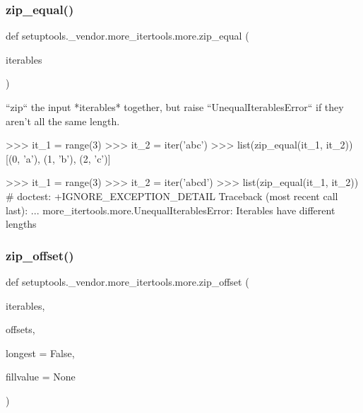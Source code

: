 \subsubsection{\texorpdfstring{zip\+\_\+equal()}{zip\_equal()}}
{\footnotesize\ttfamily def setuptools.\+\_\+vendor.\+more\+\_\+itertools.\+more.\+zip\+\_\+equal (\begin{DoxyParamCaption}\item[{}]{iterables }\end{DoxyParamCaption})}

\begin{DoxyVerb}``zip`` the input *iterables* together, but raise
``UnequalIterablesError`` if they aren't all the same length.

    >>> it_1 = range(3)
    >>> it_2 = iter('abc')
    >>> list(zip_equal(it_1, it_2))
    [(0, 'a'), (1, 'b'), (2, 'c')]

    >>> it_1 = range(3)
    >>> it_2 = iter('abcd')
    >>> list(zip_equal(it_1, it_2)) # doctest: +IGNORE_EXCEPTION_DETAIL
    Traceback (most recent call last):
    ...
    more_itertools.more.UnequalIterablesError: Iterables have different
    lengths\end{DoxyVerb}
 \mbox{\label{namespacesetuptools_1_1__vendor_1_1more__itertools_1_1more_a1b18ea084d883c1c86c2a3d018fa93f8}} 
\subsubsection{\texorpdfstring{zip\+\_\+offset()}{zip\_offset()}}
{\footnotesize\ttfamily def setuptools.\+\_\+vendor.\+more\+\_\+itertools.\+more.\+zip\+\_\+offset (\begin{DoxyParamCaption}\item[{}]{iterables,  }\item[{}]{offsets,  }\item[{}]{longest = {\ttfamily False},  }\item[{}]{fillvalue = {\ttfamily None} }\end{DoxyParamCaption})}

